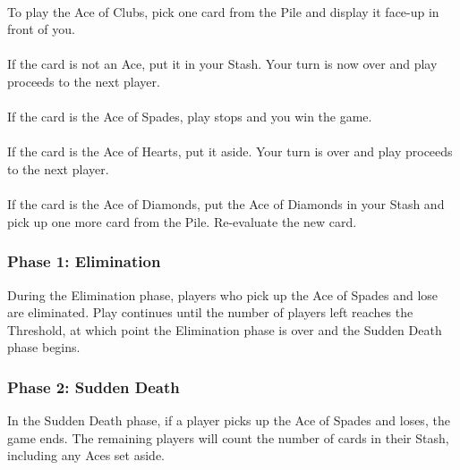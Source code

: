 \documentclass{article}
\begin{document}
\paragraph{}
To play the Ace of Clubs, pick one card from the Pile and display it
face-up in front of you.

\paragraph{}
If the card is not an Ace, put it in your Stash. Your turn is now over
and play proceeds to the next player.

\paragraph{}
If the card is the Ace of Spades, play stops and you win the game.

\paragraph{}
If the card is the Ace of Hearts, put it aside. Your turn is over and
play proceeds to the next player.

\paragraph{}
If the card is the Ace of Diamonds, put the Ace of Diamonds in your
Stash and pick up one more card from the Pile. Re-evaluate the new card.


\subsubsection{Phase 1: Elimination}
\label{sec:elimination}

During the Elimination phase, players who pick up the Ace of Spades and
lose are eliminated. Play continues until the number of players left
reaches the Threshold, at which point the Elimination phase is over and
the Sudden Death phase begins.

\subsubsection{Phase 2: Sudden Death}
\label{sec:sd}

In the Sudden Death phase, if a player picks up the Ace of Spades and
loses, the game ends. The remaining players will count the number of
cards in their Stash, including any Aces set aside.
\end{document}
